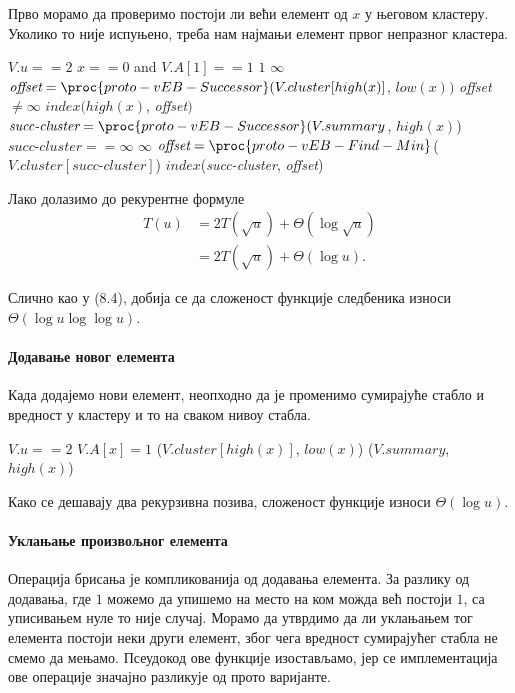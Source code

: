 \documentclass[11pt, a4paper]{article}
\theoremstyle{remark}
\numberwithin{equation}{section}
\begin{document}
	Прво морамо да проверимо постоји ли већи елемент од $x$ у његовом кластеру. Уколико то није испуњено, треба нам најмањи елемент првог непразног кластера.
	\begin{codebox}
		\li \If $V.u==2$
		\li \Do \If $x==0$ and $V.A[1]==1$
		\li \Do \Return $1$
		\li \Else \Return $\infty$
		\End
		\li \Else $\textit{offset}=\proc{proto-vEB-Successor}(V.cluster[high(x)]$, $low(x))$
		\li \Do \If \textit{offset}$\neq \infty$
		\li \Do \Return $index(high(x)$, \textit{offset}$)$
		\li \Else $\textit{succ-cluster}=\proc{proto-vEB-Successor}(V.summary$, $high(x)$)
		\li \Do \If $\textit{succ-cluster}==\infty$
		\li \Do \Return $\infty$
		\End
		\li \Else $\textit{offset}=\proc{proto-vEB-Find-Min}$($V.cluster[\textit{succ-cluster}]$)
		\li \Do \Return $index$(\textit{succ-cluster}, \textit{offset})
	\end{codebox}

	\noindent Лако долазимо до рекурентне формуле
	\begin{equation}
		\begin{split}
		T(u) &= 2T(\sqrt u)+\Theta(\log\sqrt u) \\
		&= 2T(\sqrt u)+\Theta(\log u).
		\end{split}
	\end{equation}
	
	\indent Слично као у (8.4), добија се да сложеност функције следбеника износи $\Theta(\log u\log\log u)$.
	
	\paragraph{Додавање новог елемента}
	Када додајемо нови елемент, неопходно да је променимо сумирајуће стабло и вредност у кластеру и то на сваком нивоу стабла.
	
	\begin{codebox}
		\Procname{\proc{proto-vEB-Insert}($V$, $x$)}
		\li \If $V.u==2$
		\li \Do $V.A[x]=1$
		\End
		\li \Else {}($V.cluster[high(x)]$, $low(x)$)
		\li \Do {}($V.summary$, $high(x)$)
	\end{codebox}

	Како се дешавају два рекурзивна позива, сложеност функције  износи $\Theta (\log u)$.
	
	\paragraph{Уклањање произвољног елемента}
	Операција брисања је компликованија од додавања елемента. За разлику од додавања, где $1$ можемо да упишемо на место на ком можда већ постоји $1$, са уписивањем нуле то није случај. Морамо да утврдимо да ли уклањањем тог елемента постоји неки други елемент, због чега вредност сумирајућег стабла не смемо да мењамо. Псеудокод ове функције изостављамо, јер се имплементација ове операције значајно разликује од прото варијанте.
	
\end{document}

